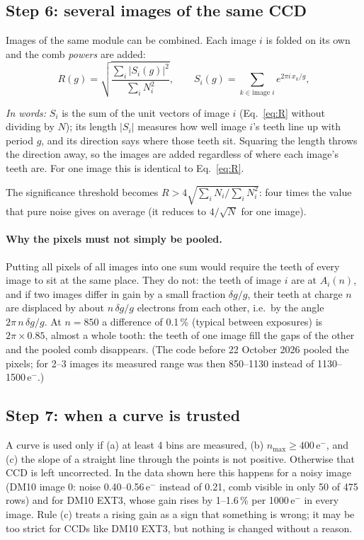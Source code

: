 \documentclass[11pt,a4paper]{article}
\newcommand{\eminus}{e$^-$}
\newcommand{\nmax}{n_{\mathrm{max}}}
\newcommand{\inwords}[1]{\par\noindent\textit{In words:} #1\par}
\begin{document}
\subsection{Step 6: several images of the same CCD}
\label{sec:multi}
Images of the same module can be combined. Each image $i$ is folded on its own and the comb
\emph{powers} are added:
\begin{equation}
R(g) = \sqrt{ \frac{\sum_i |S_i(g)|^2}{\sum_i N_i^2} }, \qquad S_i(g) = \sum_{k \in \text{image } i} e^{2\pi i\,x_k/g},
\label{eq:Rmulti}
\end{equation}
\inwords{$S_i$ is the sum of the unit vectors of image $i$ (Eq.~\ref{eq:R} without dividing by $N$);
its length $|S_i|$ measures how well image $i$'s teeth line up with period $g$, and its direction
says where those teeth sit. Squaring the length throws the direction away, so the images are added
regardless of where each image's teeth are. For one image this is identical to Eq.~\ref{eq:R}.}
The significance threshold becomes $R > 4\sqrt{\sum_i N_i/\sum_i N_i^2}$: four times the value that
pure noise gives on average (it reduces to $4/\sqrt N$ for one image).

\paragraph{Why the pixels must not simply be pooled.} Putting all pixels of all images into one sum
would require the teeth of every image to sit at the same place. They do not: the teeth of image $i$
are at $A_i(n)$, and if two images differ in gain by a small fraction $\delta g/g$, their teeth at
charge $n$ are displaced by about $n\,\delta g/g$ electrons from each other, i.e.\ by the angle
$2\pi\,n\,\delta g/g$. At $n = 850$ a difference of 0.1\,\% (typical between exposures) is
$2\pi \times 0.85$, almost a whole tooth: the teeth of one image fill the gaps of the other and the
pooled comb disappears. (The code before 22 October 2026 pooled the pixels; for 2--3 images its measured
range was then 850--1130 instead of 1130--1500\,\eminus.)

\subsection{Step 7: when a curve is trusted}
A curve is used only if (a) at least 4 bins are measured, (b) $\nmax \ge 400$\,\eminus, and (c) the slope
of a straight line through the points is not positive. Otherwise that CCD is left uncorrected. In the
data shown here this happens for a noisy image (DM10 image 0: noise 0.40--0.56\,\eminus{} instead of 0.21,
comb visible in only 50 of 475 rows) and for DM10 EXT3, whose gain rises by 1--1.6\,\% per 1000\,\eminus{}
in every image. Rule (c) treats a rising gain as a sign that something is wrong; it may be too strict
for CCDs like DM10 EXT3, but nothing is changed without a reason.
\end{document}
